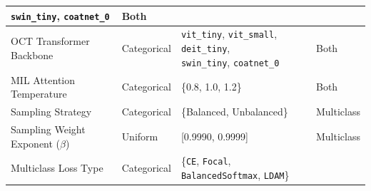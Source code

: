 \documentclass[preprint,12pt]{elsarticle}
\begin{document}
\begin{table}[!t]
\begin{tabular}{|p{}|p{}|p{}|p{}|}
{        \texttt{swin\_tiny}, \texttt{coatnet\_0}}                                &
        Both                                                                                                                                                           \\
        \hline
        OCT Transformer Backbone                                                 &
        Categorical                                                              &
        \makecell[l]{\texttt{vit\_tiny}, \texttt{vit\_small}, \texttt{deit\_tiny},                                                                                     \\
        \texttt{swin\_tiny}, \texttt{coatnet\_0}}                                &
        Both                                                                                                                                                           \\
        \hline
        MIL Attention Temperature                                                &
        Categorical                                                              &
        \{0.8, 1.0, 1.2\}                                                        &
        Both                                                                                                                                                           \\
        \hline
        Sampling Strategy                                                        &
        Categorical                                                              &
        \{Balanced, Unbalanced\}                                                 &
        Multiclass                                                                                                                                                     \\
        \hline
        Sampling Weight Exponent ($\beta$)                                       &
        Uniform                                                                  &
        [0.9990, 0.9999]                                                         &
        Multiclass                                                                                                                                                     \\
        \hline
        Multiclass Loss Type                                                     &
        Categorical                                                              &
        \{\texttt{CE}, \texttt{Focal}, \texttt{BalancedSoftmax}, \texttt{LDAM}\} &

\end{tabular}
\end{table}
\end{document}
